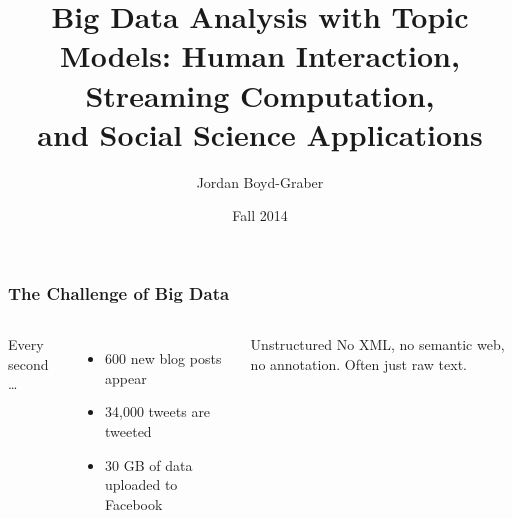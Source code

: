 \documentclass[compress]{beamer}
\title[Big Data Topic Models]{Big Data Analysis with Topic Models: Human Interaction, Streaming Computation, \\and Social Science Applications}
\author{Jordan Boyd-Graber}
\date{Fall 2014}
\begin{document}

\frame{\titlepage}

\begin{frame}
\frametitle{The Challenge of Big Data}

\begin{columns}


Every second \dots
\begin{itemize}
  \item 600 new blog posts appear
  \item 34,000 tweets are tweeted
  \item 30 GB of data uploaded to Facebook
\end{itemize}
\pause

\begin{block}{Unstructured}
  No XML, no semantic web, no annotation.  Often just raw text.
\end{block}



\end{columns}

\end{frame}
\end{document}
